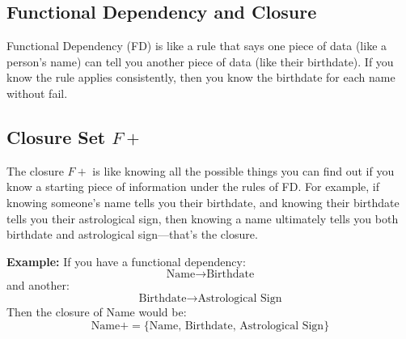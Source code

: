 \vspace{-0.3cm}
\subsection*{Functional Dependency and Closure}
\vspace{-0.1cm}

\noindent
Functional Dependency (FD) is like a rule that says one piece of data (like a person's name) can tell you another piece of data (like their birthdate). If you know the rule applies consistently, then you know the birthdate for each name without fail.

\vspace{-0.3cm}
\subsection*{Closure Set \( F+ \)}
\vspace{-0.1cm}

\noindent
The closure \( F+ \) is like knowing all the possible things you can find out if you know a starting piece of information under the rules of FD. For example, if knowing someone's name tells you their birthdate, and knowing their birthdate tells you their astrological sign, then knowing a name ultimately tells you both birthdate and astrological sign—that's the closure.

\noindent
\textbf{Example:} If you have a functional dependency:
\[ \text{Name} \rightarrow \text{Birthdate} \]
and another:
\[ \text{Birthdate} \rightarrow \text{Astrological Sign} \]
Then the closure of Name would be:
\[ \text{Name}+ = \{ \text{Name, Birthdate, Astrological Sign} \} \]
